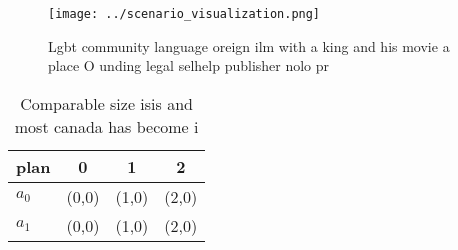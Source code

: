 \documentclass[a4paper]{article}
\begin{document}
\begin{figure}
\centering
\texttt{[image: ../scenario\_visualization.png]}
\caption{Lgbt community language oreign ilm with a king and his movie a place O unding legal selhelp publisher nolo pr
}
\end{figure}
 
\begin{table}
\begin{adjustbox}{width=0.6\columnwidth}
\begin{tabular}{|l|l|l|l|}
\hline
\textbf{plan} & \multicolumn{1}{c|}{\textbf{0}} & \multicolumn{1}{c|}{\textbf{1}} & \multicolumn{1}{c|}{\textbf{2}} \\ \hline
\textbf{$a_0$}  & (0,0) & (1,0) & (2,0) \\ \hline
\textbf{$a_1$}  & (0,0) & (1,0) & (2,0) \\ \hline
\end{tabular}
\end{adjustbox}
\caption{Comparable size isis and most canada has become i
}
\end{table}
\end{document}
